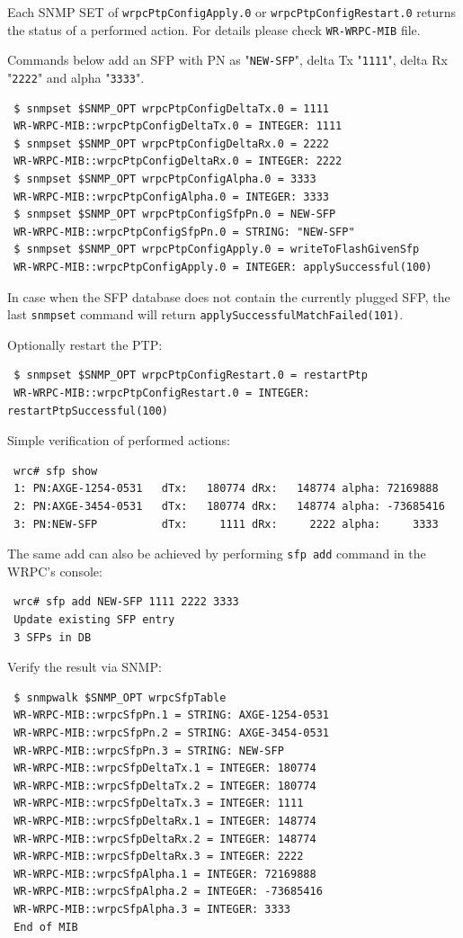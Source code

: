 \documentclass[a4paper, 12pt]{article}
\renewcommand{\_}{\underscore\allowbreak}
\begin{document}
Each SNMP SET of \texttt{wrpcPtpConfigApply.0} or \texttt{wrpcPtpConfigRestart.0} returns
the status of a performed action. For details please check \texttt{WR-WRPC-MIB}
file.

Commands below add an SFP with PN as "\texttt{NEW-SFP}", delta Tx "\texttt{1111}",
delta Rx "\texttt{2222}" and alpha "\texttt{3333}".
\begin{lstlisting}
 $ snmpset $SNMP_OPT wrpcPtpConfigDeltaTx.0 = 1111
 WR-WRPC-MIB::wrpcPtpConfigDeltaTx.0 = INTEGER: 1111
 $ snmpset $SNMP_OPT wrpcPtpConfigDeltaRx.0 = 2222
 WR-WRPC-MIB::wrpcPtpConfigDeltaRx.0 = INTEGER: 2222
 $ snmpset $SNMP_OPT wrpcPtpConfigAlpha.0 = 3333
 WR-WRPC-MIB::wrpcPtpConfigAlpha.0 = INTEGER: 3333
 $ snmpset $SNMP_OPT wrpcPtpConfigSfpPn.0 = NEW-SFP
 WR-WRPC-MIB::wrpcPtpConfigSfpPn.0 = STRING: "NEW-SFP"
 $ snmpset $SNMP_OPT wrpcPtpConfigApply.0 = writeToFlashGivenSfp
 WR-WRPC-MIB::wrpcPtpConfigApply.0 = INTEGER: applySuccessful(100)
\end{lstlisting}

In case when the SFP database does not contain the currently plugged SFP, the last
\texttt{snmpset} command will return \texttt{applySuccessfulMatchFailed(101)}.

Optionally restart the PTP:
\begin{lstlisting}
 $ snmpset $SNMP_OPT wrpcPtpConfigRestart.0 = restartPtp
 WR-WRPC-MIB::wrpcPtpConfigRestart.0 = INTEGER: restartPtpSuccessful(100)
\end{lstlisting}

Simple verification of performed actions:\\
\begin{minipage}{\textwidth}
\begin{lstlisting}
 wrc# sfp show
 1: PN:AXGE-1254-0531   dTx:   180774 dRx:   148774 alpha: 72169888
 2: PN:AXGE-3454-0531   dTx:   180774 dRx:   148774 alpha: -73685416
 3: PN:NEW-SFP          dTx:     1111 dRx:     2222 alpha:     3333
\end{lstlisting}
\end{minipage}

The same add can also be achieved by performing \texttt{sfp add} command in
the WRPC's console:
\begin{lstlisting}
 wrc# sfp add NEW-SFP 1111 2222 3333
 Update existing SFP entry
 3 SFPs in DB
\end{lstlisting}

Verify the result via SNMP:
\begin{lstlisting}
 $ snmpwalk $SNMP_OPT wrpcSfpTable
 WR-WRPC-MIB::wrpcSfpPn.1 = STRING: AXGE-1254-0531
 WR-WRPC-MIB::wrpcSfpPn.2 = STRING: AXGE-3454-0531
 WR-WRPC-MIB::wrpcSfpPn.3 = STRING: NEW-SFP
 WR-WRPC-MIB::wrpcSfpDeltaTx.1 = INTEGER: 180774
 WR-WRPC-MIB::wrpcSfpDeltaTx.2 = INTEGER: 180774
 WR-WRPC-MIB::wrpcSfpDeltaTx.3 = INTEGER: 1111
 WR-WRPC-MIB::wrpcSfpDeltaRx.1 = INTEGER: 148774
 WR-WRPC-MIB::wrpcSfpDeltaRx.2 = INTEGER: 148774
 WR-WRPC-MIB::wrpcSfpDeltaRx.3 = INTEGER: 2222
 WR-WRPC-MIB::wrpcSfpAlpha.1 = INTEGER: 72169888
 WR-WRPC-MIB::wrpcSfpAlpha.2 = INTEGER: -73685416
 WR-WRPC-MIB::wrpcSfpAlpha.3 = INTEGER: 3333
 End of MIB
\end{lstlisting}
\end{document}
